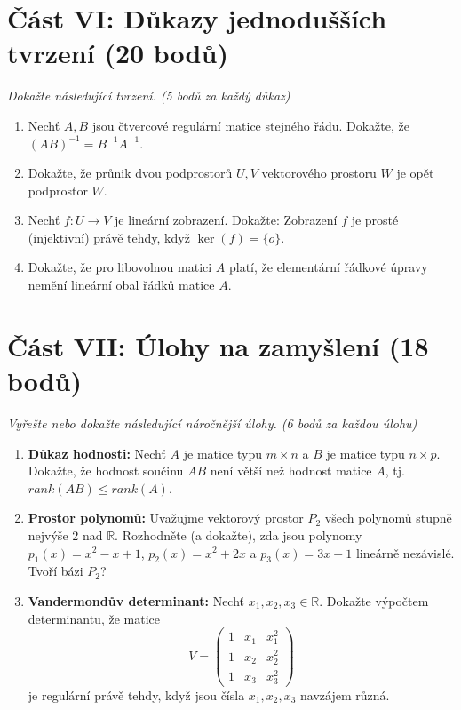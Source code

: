 \documentclass[a4paper,11pt]{article}
\begin{document}
\vspace{0.5cm}

\section*{Část VI: Důkazy jednodušších tvrzení (20 bodů)}
\textit{Dokažte následující tvrzení. (5 bodů za každý důkaz)}

\begin{enumerate}
    \item Nechť $A, B$ jsou čtvercové regulární matice stejného řádu. Dokažte, že $(AB)^{-1} = B^{-1}A^{-1}$.
    \item Dokažte, že průnik dvou podprostorů $U, V$ vektorového prostoru $W$ je opět podprostor $W$.
    \item Nechť $f: U \to V$ je lineární zobrazení. Dokažte: Zobrazení $f$ je prosté (injektivní) právě tehdy, když $\ker(f) = \{o\}$.
    \item Dokažte, že pro libovolnou matici $A$ platí, že elementární řádkové úpravy nemění lineární obal řádků matice $A$.
\end{enumerate}

\vspace{0.5cm}

\section*{Část VII: Úlohy na zamyšlení (18 bodů)}
\textit{Vyřešte nebo dokažte následující náročnější úlohy. (6 bodů za každou úlohu)}

\begin{enumerate}
    \item \textbf{Důkaz hodnosti:} Nechť $A$ je matice typu $m \times n$ a $B$ je matice typu $n \times p$. Dokažte, že hodnost součinu $AB$ není větší než hodnost matice $A$, tj. $rank(AB) \leq rank(A)$.
    
    \item \textbf{Prostor polynomů:} Uvažujme vektorový prostor $P_2$ všech polynomů stupně nejvýše 2 nad $\mathbb{R}$. Rozhodněte (a dokažte), zda jsou polynomy $p_1(x) = x^2 - x + 1$, $p_2(x) = x^2 + 2x$ a $p_3(x) = 3x - 1$ lineárně nezávislé. Tvoří bázi $P_2$?
    
    \item \textbf{Vandermondův determinant:}
    Nechť $x_1, x_2, x_3 \in \mathbb{R}$. Dokažte výpočtem determinantu, že matice
    $$
    V = \begin{pmatrix}
    1 & x_1 & x_1^2 \\
    1 & x_2 & x_2^2 \\
    1 & x_3 & x_3^2
    \end{pmatrix}
    $$
    je regulární právě tehdy, když jsou čísla $x_1, x_2, x_3$ navzájem různá.
\end{enumerate}
\end{document}
